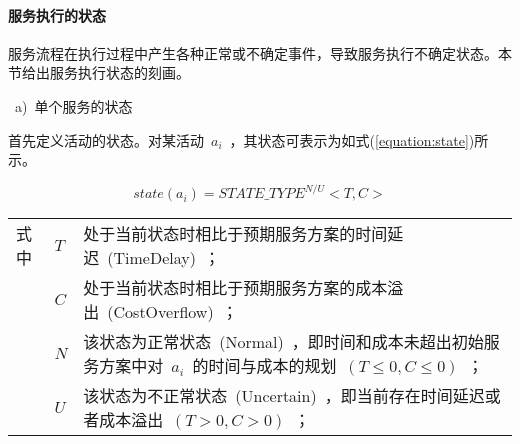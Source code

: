 %
%    
%    
%    
%    
%    
%    
%    
%    
%    

\paragraph{服务执行的状态} 

服务流程在执行过程中产生各种正常或不确定事件，导致服务执行不确定状态。本节给出服务执行状态的刻画。

~a)~单个服务的状态

首先定义活动的状态。对某活动~$a_i$~，其状态可表示为如式(\ref{equation:state})所示。

\begin{equation}\label{equation:state}
state(a_i)=STATE\_TYPE^{N/U}<T, C>
\end{equation}
\begin{tabularx}{\textwidth}{@{}l@{\quad}l@{\pozhehao }X@{}}
    式中
    & $T$ & 处于当前状态时相比于预期服务方案的时间延迟~(TimeDelay)~；\\
    & $C$ & 处于当前状态时相比于预期服务方案的成本溢出~(CostOverflow)~；\\
    & $N$ & 该状态为正常状态~(Normal)~，即时间和成本未超出初始服务方案中对~$a_i$~的时间与成本的规划~$(T\le 0, C\le 0)$~；\\
    & $U$ & 该状态为不正常状态~(Uncertain)~，即当前存在时间延迟或者成本溢出~$(T>0, C>0)$~；
\end{tabularx}\vspace{\wordsep}

